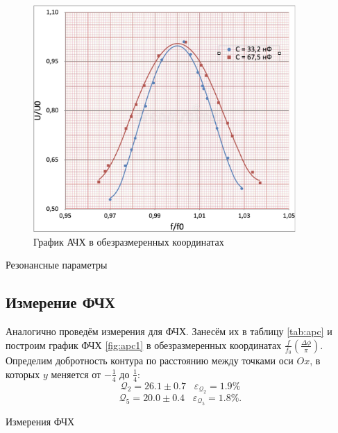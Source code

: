 \documentclass[12pt,a4paper]{article}
\begin{document}
\begin{figure}[H]
	\centering
	\includegraphics[width=10cm]{"src/afc2.png"}
	\caption{График АЧХ в обезразмеренных координатах}
	\label{fig:afc2}
\end{figure}

\begin{table}[H]
	\centering
	\footnotesize
	
	\caption{Резонансные параметры}
	\label{tab:res}
\end{table}

\subsection*{Измерение ФЧХ}

Аналогично проведём измерения для ФЧХ. Занесём их в таблицу \ref{tab:apc} и построим график ФЧХ \ref{fig:apc1} в обезразмеренных координатах $\frac{f}{f_0}\left(\frac{\Delta \phi}{\pi} \right)$. Определим добротность контура по расстоянию между точками оси $Ox$, в которых $y$ меняется от $-\frac{1}{4}$ до $\frac{1}{4}$:
    $$\mathcal{Q}_2 = 26.1 \pm 0.7 \;\;\; \varepsilon_{\mathcal{Q}_2} = 1.9 \%$$
    $$\mathcal{Q}_5 = 20.0 \pm 0.4 \;\;\; \varepsilon_{\mathcal{Q}_5} = 1.8 \%.$$

\begin{table}[H]
	\centering
	\footnotesize
	
	\caption{Измерения ФЧХ}
	\label{tab:apc}
\end{table}
\end{document}
